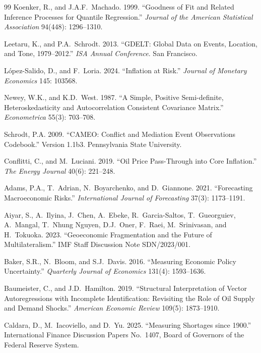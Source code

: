\documentclass[12pt]{article}
\begin{document}
\begin{thebibliography}{99}
Koenker, R., and J.A.F.~Machado. 1999.
``Goodness of Fit and Related Inference Processes for Quantile Regression.''
\textit{Journal of the American Statistical Association}
94(448): 1296--1310.

Leetaru, K., and P.A.~Schrodt. 2013.
``GDELT: Global Data on Events, Location, and Tone, 1979--2012.''
\textit{ISA Annual Conference}. San Francisco.

L\'{o}pez-Salido, D., and F.~Loria. 2024.
``Inflation at Risk.''
\textit{Journal of Monetary Economics} 145: 103568.

Newey, W.K., and K.D.~West. 1987.
``A Simple, Positive Semi-definite, Heteroskedasticity and
Autocorrelation Consistent Covariance Matrix.''
\textit{Econometrica} 55(3): 703--708.

Schrodt, P.A. 2009.
``CAMEO: Conflict and Mediation Event Observations Codebook.''
Version 1.1b3. Pennsylvania State University.

Conflitti, C., and M.~Luciani. 2019.
``Oil Price Pass-Through into Core Inflation.''
\textit{The Energy Journal} 40(6): 221--248.


Adams, P.A., T.~Adrian, N.~Boyarchenko, and D.~Giannone. 2021.
``Forecasting Macroeconomic Risks.''
\textit{International Journal of Forecasting} 37(3): 1173--1191.

Aiyar, S., A.~Ilyina, J.~Chen, A.~Ebeke, R.~Garcia-Saltos,
T.~Gueorguiev, A.~Mangal, T.~Nhung Nguyen, D.J.~Oner,
F.~Raei, M.~Srinivasan, and H.~Tokuoka. 2023.
``Geoeconomic Fragmentation and the Future of Multilateralism.''
IMF Staff Discussion Note SDN/2023/001.

Baker, S.R., N.~Bloom, and S.J.~Davis. 2016.
``Measuring Economic Policy Uncertainty.''
\textit{Quarterly Journal of Economics} 131(4): 1593--1636.

Baumeister, C., and J.D.~Hamilton. 2019.
``Structural Interpretation of Vector Autoregressions with Incomplete
Identification: Revisiting the Role of Oil Supply and Demand Shocks.''
\textit{American Economic Review} 109(5): 1873--1910.

Caldara, D., M.~Iacoviello, and D.~Yu. 2025.
``Measuring Shortages since 1900.''
International Finance Discussion Papers No.~1407,
Board of Governors of the Federal Reserve System.


\end{thebibliography}
\end{document}
